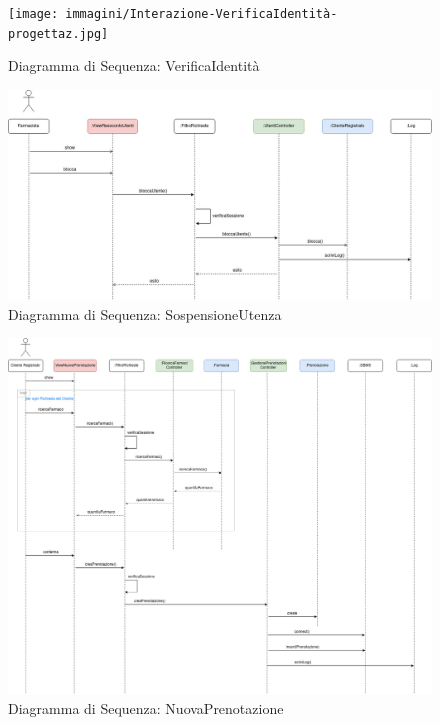\newpage

\begin{figure}[h!]
    \begin{center}
        \texttt{[image: immagini/Interazione-VerificaIdentità-progettaz.jpg]}
        \caption{Diagramma di Sequenza: VerificaIdentità}
    \end{center}
\end{figure}

\begin{figure}[h!]
    \begin{center}
        \includegraphics[width=\textwidth]{immagini/Interazione-SospensioneUtenza-progettaz.jpg}
        \caption{Diagramma di Sequenza: SospensioneUtenza}
    \end{center}
\end{figure}


\newpage

\begin{figure}[h!]
    \begin{center}
        \includegraphics[width=\textwidth]{immagini/Interazione-NuovaPrenotazione-progettaz.jpg}
        \caption{Diagramma di Sequenza: NuovaPrenotazione}
    \end{center}
\end{figure}

